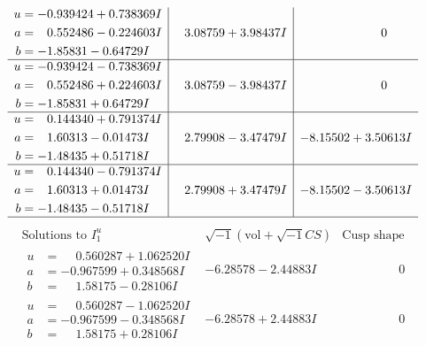 \documentclass[1p]{elsarticle_modified}
\theoremstyle{definition}
\newcommand{\I}{\sqrt{-1}}
\begin{document}
$$\begin{array}{c|c|c}
\begin{aligned}
u &= -0.939424 + 0.738369 I \\
a &= \phantom{-}0.552486 - 0.224603 I \\
b &= -1.85831 - 0.64729 I\end{aligned}
 & \phantom{-}3.08759 + 3.98437 I & \phantom{-0.000000 } 0 \\ \hline\begin{aligned}
u &= -0.939424 - 0.738369 I \\
a &= \phantom{-}0.552486 + 0.224603 I \\
b &= -1.85831 + 0.64729 I\end{aligned}
 & \phantom{-}3.08759 - 3.98437 I & \phantom{-0.000000 } 0 \\ \hline\begin{aligned}
u &= \phantom{-}0.144340 + 0.791374 I \\
a &= \phantom{-}1.60313 - 0.01473 I \\
b &= -1.48435 + 0.51718 I\end{aligned}
 & \phantom{-}2.79908 - 3.47479 I & -8.15502 + 3.50613 I \\ \hline\begin{aligned}
u &= \phantom{-}0.144340 - 0.791374 I \\
a &= \phantom{-}1.60313 + 0.01473 I \\
b &= -1.48435 - 0.51718 I\end{aligned}
 & \phantom{-}2.79908 + 3.47479 I & -8.15502 - 3.50613 I\\
 \hline 
 \end{array}$$\newpage$$\begin{array}{c|c|c}  
\text{Solutions to }I^u_{1}& \I (\text{vol} + \sqrt{-1}CS) & \text{Cusp shape}\\
 \hline 
\begin{aligned}
u &= \phantom{-}0.560287 + 1.062520 I \\
a &= -0.967599 + 0.348568 I \\
b &= \phantom{-}1.58175 - 0.28106 I\end{aligned}
 & -6.28578 - 2.44883 I & \phantom{-0.000000 } 0 \\ \hline\begin{aligned}
u &= \phantom{-}0.560287 - 1.062520 I \\
a &= -0.967599 - 0.348568 I \\
b &= \phantom{-}1.58175 + 0.28106 I\end{aligned}
 & -6.28578 + 2.44883 I & \phantom{-0.000000 } 0 \\ \hline\begin{aligned}

\end{aligned}
\end{array}$$
\end{document}
